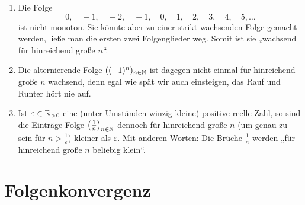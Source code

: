 \begin{bsp} \label{bsp:eventually} \quad
    \begin{enumerate}
        \item Die Folge
            \[ 0,\quad -1,\quad -2,\quad -1,\quad 0,\quad 1,\quad 2,\quad 3,\quad 4, \quad 5,\dots \]
        ist nicht monoton. Sie könnte aber zu einer strikt wachsenden Folge gemacht werden, ließe man die ersten zwei Folgenglieder weg. Somit ist sie „wachsend für hinreichend große $n$“.
        \item Die alternierende Folge $((-1)^n)_{n\in \mathbb N}$ ist dagegen nicht einmal für hinreichend große $n$ wachsend, denn egal wie spät wir auch einsteigen, das Rauf und Runter hört nie auf.
        \item Ist $\varepsilon \in \mathbb R_{>0}$ eine (unter Umständen winzig kleine) positive reelle Zahl, so sind die Einträge Folge $\left(\frac{1}{n}\right)_{n\in \mathbb N}$ dennoch für hinreichend große $n$ (um genau zu sein für $n> \frac{1}{\varepsilon}$) kleiner als $\varepsilon$. Mit anderen Worten: Die Brüche $\frac{1}{n}$ werden „für hinreichend große $n$ beliebig klein“.
    \end{enumerate}
\end{bsp}





\section{Folgenkonvergenz}


